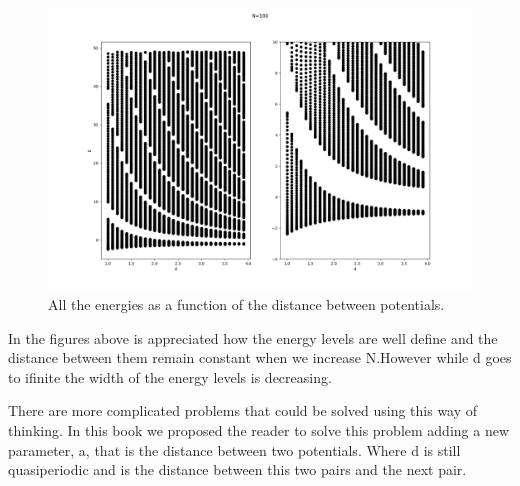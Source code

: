 \begin{figure}[H]
  \includegraphics{images5/Etotal_d_N=100.png}
  \centering
  \caption{All the energies as a function of the distance between potentials.}
\end{figure}

In the figures above is appreciated how the energy levels are well define and the distance between them remain constant when we increase N.However while d goes to ifinite the width of the energy levels is decreasing.

There are more complicated problems that could be solved using this way of thinking. In this book we proposed the reader to solve this problem adding a new parameter, a, that is the distance between two potentials. Where d is still quasiperiodic and is the distance between this two pairs and the next pair.




